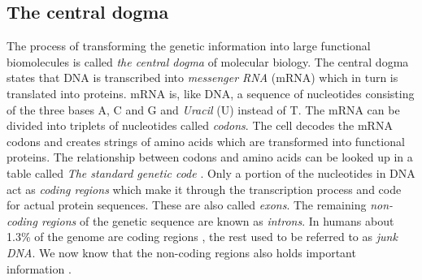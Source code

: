 \documentclass[thesis.tex]{subfiles}
\begin{document}
\subsection{The central dogma}
The process of transforming the genetic information into large functional biomolecules is called \textit{the central dogma} of molecular biology. The central dogma states that DNA is transcribed into \textit{messenger RNA} (mRNA) which in turn is translated into proteins. mRNA is, like DNA, a sequence of nucleotides consisting of the three bases A, C and G and \textit{Uracil} (U) instead of T. The mRNA can be divided into triplets of nucleotides called \textit{codons}. The cell decodes the mRNA codons and creates strings of amino acids which are transformed into functional proteins. The relationship between codons and amino acids can be looked up in a table called \textit{The standard genetic code} \cite[Chapter 1, p. 6]{introduction_to_genomics}. Only a portion of the nucleotides in DNA act as \textit{coding regions} which make it through the transcription process and code for actual protein sequences. These are also called \textit{exons}. The remaining \textit{non-coding regions} of the genetic sequence are known as \textit{introns}. In humans about 1.3\% of the genome are coding regions \cite[Chapter 4]{introduction_to_genomics}, the rest used to be referred to as \textit{junk DNA}. We now know that the non-coding regions also holds important information \cite{encyclopedia}.
\end{document}
